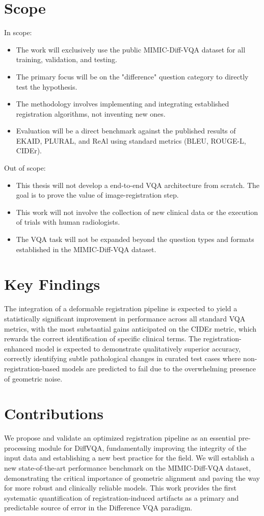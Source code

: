 \section{Scope}
In scope:
\begin{itemize}
    \item The work will exclusively use the public MIMIC-Diff-VQA dataset for all training, validation, and testing.
    \item The primary focus will be on the "difference" question category to directly test the hypothesis.
    \item The methodology involves implementing and integrating established registration algorithms, not inventing new ones.
    \item Evaluation will be a direct benchmark against the published results of EKAID, PLURAL, and ReAl using standard metrics (BLEU, ROUGE-L, CIDEr).
\end{itemize}

Out of scope:
\begin{itemize}
	\item This thesis will not develop a end-to-end VQA architecture from scratch. The goal is to prove the value of image-registration step.
	\item This work will not involve the collection of new clinical data or the execution of trials with human radiologists.
	\item The VQA task will not be expanded beyond the question types and formats established in the MIMIC-Diff-VQA dataset.
\end{itemize}

\section{Key Findings}
The integration of a deformable registration pipeline is expected to yield a statistically significant improvement in performance across all standard VQA metrics, with the most substantial gains anticipated on the CIDEr metric, which rewards the correct identification of specific clinical terms. The registration-enhanced model is expected to demonstrate qualitatively superior accuracy, correctly identifying subtle pathological changes in curated test cases where non-registration-based models are predicted to fail due to the overwhelming presence of geometric noise.

\section{Contributions}
We propose and validate an optimized registration pipeline as an essential pre-processing module for DiffVQA, fundamentally improving the integrity of the input data and establishing a new best practice for the field. We will establish a new state-of-the-art performance benchmark on the MIMIC-Diff-VQA dataset, demonstrating the critical importance of geometric alignment and paving the way for more robust and clinically reliable models. This work provides the first systematic quantification of registration-induced artifacts as a primary and predictable source of error in the Difference VQA paradigm.

